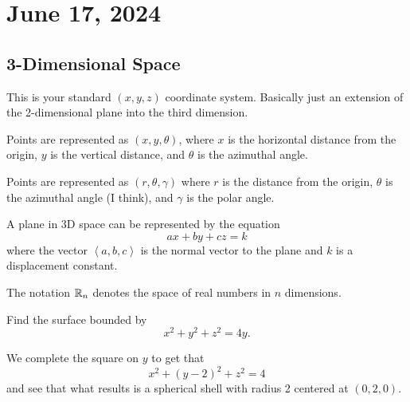 \documentclass[11pt]{scrartcl}
\begin{document}
\section{June 17, 2024}

\subsection{3-Dimensional Space}

\begin{definition}
    This is your standard $(x, y, z)$ coordinate system. Basically just an extension of the 2-dimensional plane into the third dimension.
\end{definition}

\begin{definition}
    Points are represented as $(x, y, \theta)$, where $x$ is the horizontal distance from the origin, $y$ is the vertical distance, and $\theta$ is the azimuthal angle.
\end{definition}

\begin{definition}
    Points are represented as $(r, \theta, \gamma)$ where $r$ is the distance from the origin, $\theta$ is the azimuthal angle (I think), and $\gamma$ is the polar angle.
\end{definition}

\begin{definition}
    A plane in 3D space can be represented by the equation
    \[ax + by + cz = k\]
    where the vector $\left<a, b, c\right>$ is the normal vector to the plane and $k$ is a displacement constant.
\end{definition}

\begin{definition}
    The notation $\mathbb R_{n}$ denotes the space of real numbers in $n$ dimensions.
\end{definition}

\begin{example}
    Find the surface bounded by
    \[x^{2} + y^{2} + z^{2} = 4y.\]

    \begin{soln}
        We complete the square on $y$ to get that
        \[x^{2} + (y - 2)^{2} + z^{2} = 4\]
        and see that what results is a spherical shell with radius 2 centered at $(0, 2, 0)$.
    \end{soln}
\end{example}
\end{document}
